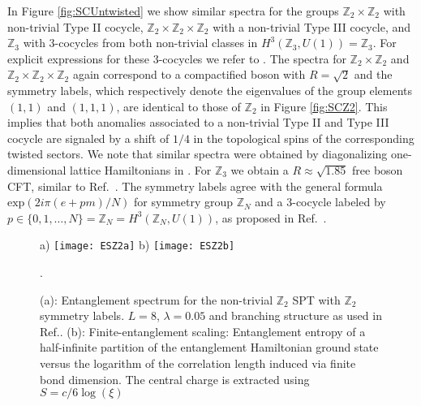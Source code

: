 \documentclass[aps,pra,twocolumn,superscriptaddress,10pt,article,nofootinbib,showpacs]{revtex4-1}
\begin{document}
In Figure \ref{fig:SCUntwisted} we show similar spectra for the groups $\mathbb{Z}_2\times\mathbb{Z}_2$ with non-trivial Type II cocycle, $\mathbb{Z}_2\times\mathbb{Z}_2\times\mathbb{Z}_2$ with a non-trivial Type III cocycle, and $\mathbb{Z}_3$ with 3-cocycles from both non-trivial classes in $H^3(\mathbb{Z}_3,U(1))=\mathbb{Z}_3$. For explicit expressions for these 3-cocycles we refer to \cite{Propitius,Zaletel}. The spectra for $\mathbb{Z}_2\times\mathbb{Z}_2$ and $\mathbb{Z}_2\times\mathbb{Z}_2\times\mathbb{Z}_2$ again correspond to a compactified boson with $R=\sqrt{2}$ and the symmetry labels, which respectively denote the eigenvalues of the group elements $(1,1)$ and $(1,1,1)$, are identical to those of $\mathbb{Z}_2$ in Figure \ref{fig:SCZ2}. This implies that both anomalies associated to a non-trivial Type II and Type III cocycle are signaled by a shift of $1/4$ in the topological spins of the corresponding twisted sectors. We note that similar spectra were obtained by diagonalizing one-dimensional lattice Hamiltonians in \cite{Bridgeman2}. For $\mathbb{Z}_3$ we obtain a $R\approx \sqrt{1.85}$ free boson CFT, similar to Ref.~\cite{ScaffidiRingel}. The symmetry labels agree with the general formula $\text{exp}(2i\pi(e+pm)/N)$ for symmetry group $\mathbb{Z}_N$ and a 3-cocycle labeled by $p\in \{0,1,\dots ,N\}= \mathbb{Z}_N=H^3(\mathbb{Z}_N,U(1))$, as proposed in Ref.~\cite{ChenWen}. 

\begin{figure}[t]
a)
\texttt{[image: ESZ2a]} b)
\texttt{[image: ESZ2b]}
\caption{(a): Entanglement spectrum for the non-trivial $\mathbb{Z}_2$ SPT with $\mathbb{Z}_2$ symmetry labels. $L=8$, $\lambda = 0.05$ and branching structure as used in Ref.\cite{FermionicPEPSpaper}. (b): Finite-entanglement scaling: Entanglement entropy of a half-infinite partition of the entanglement Hamiltonian ground state versus the logarithm of the correlation length induced via finite bond dimension. The central charge is extracted using $S=c/6\log(\xi)$ \cite{CalabreseCardy}}. \label{fig:Z2ES}
\end{figure}
\end{document}
